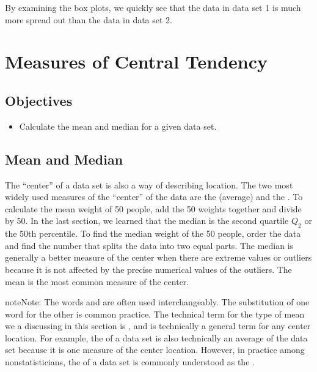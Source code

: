 \documentclass[letterpaper,10pt,english]{jupyterBook}
\begin{document}
\sphinxAtStartPar
By examining the box plots, we quickly see that the data in data set 1 is much more spread out than the data in data set 2.

\sphinxstepscope


\section{Measures of Central Tendency}
\label{\detokenize{Ch2 Descriptive Statistics/2.2 Measures of Central Tendency:measures-of-central-tendency}}\label{\detokenize{Ch2 Descriptive Statistics/2.2 Measures of Central Tendency::doc}}

\subsection{Objectives}
\label{\detokenize{Ch2 Descriptive Statistics/2.2 Measures of Central Tendency:objectives}}\begin{itemize}
\item {} 
\sphinxAtStartPar
Calculate the mean and median for a given data set.

\end{itemize}


\subsection{Mean and Median}
\label{\detokenize{Ch2 Descriptive Statistics/2.2 Measures of Central Tendency:mean-and-median}}
\sphinxAtStartPar
The “center” of a data set is also a way of describing location. The two most widely used measures of the “center” of the data are the  (average) and the . To calculate the mean weight of 50 people, add the 50 weights together and divide by 50. In the last section, we learned that the median is the second quartile \(Q_2\) or the 50th percentile. To find the median weight of the 50 people, order the data and find the number that splits the data into two equal parts. The median is generally a better measure of the center when there are extreme values or outliers because it is not affected by the precise numerical values of the outliers. The mean is the most common measure of the center.

\begin{sphinxadmonition}{note}{Note:}
\sphinxAtStartPar
The words  and  are often used interchangeably. The substitution of one word for the other is common practice. The technical term for the type of mean we a discussing in this section is , and  is technically a general term for any center location. For example, the  of a data set is also technically an average of the data set because it is one measure of the center location. However, in practice among non\sphinxhyphen{}statisticians, the  of a data set is commonly understood as the .
\end{sphinxadmonition}
\end{document}
